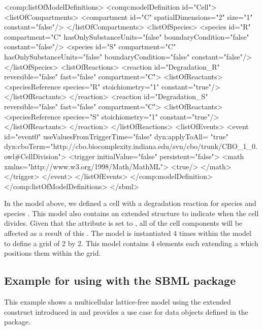 \begin{example}
	<comp:listOfModelDefinitions>
		<comp:modelDefinition id="Cell">
			<listOfCompartments>
				<compartment id="C" spatialDimensions="2" size="1" constant="false"/>
			</listOfCompartments>
			<listOfSpecies>
				<species id="R" compartment="C" hasOnlySubstanceUnits="false" 
				         boundaryCondition="false" constant="false"/>
				<species id="S" compartment="C" hasOnlySubstanceUnits="false" 
				         boundaryCondition="false" constant="false"/>
			</listOfSpecies>
			<listOfReactions>
				<reaction id="Degradation_R" reversible="false" fast="false" compartment="C">
					<listOfReactants>
						<speciesReference species="R" stoichiometry="1" constant="true"/>
					</listOfReactants>
				</reaction>
				<reaction id="Degradation_S" reversible="false" fast="false" compartment="C">
					<listOfReactants>
						<speciesReference species="S" stoichiometry="1" constant="true"/>
					</listOfReactants>
				</reaction>
			</listOfReactions>
			<listOfEvents>
				<event id="event0" useValuesFromTriggerTime="false" dyn:applyToAll= "true"
				  dyn:cboTerm="http://cbo.biocomplexity.indiana.edu/svn/cbo/trunk/CBO_1_0.owl#CellDivision">
					<trigger initialValue="false" persistent="false">
						<math xmlns="http://www.w3.org/1998/Math/MathML">
							<true/>
						</math>
					</trigger>
				</event>
			</listOfEvents>
		</comp:modelDefinition>
	</comp:listOfModelDefinitions>
</sbml>


\end{example}

In the model above, we defined a cell with a degradation reaction for species  and species . This model also contains an extended \Event structure to indicate when the cell divides. Given that the  attribute is set to , all of the cell components will be affected as a result of this \Event. The  model is instantiated 4 times within the  model to define a grid of 2 by 2. This model contains 4 \Compartment elements each extending a \ListOfSpatialComponents which positions them within the grid.

\subsection{Example for using  with the SBML  package}

This example shows a multicellular lattice-free model using the extended \Event construct introduced in  and provides a use case for data objects defined in the  package.

